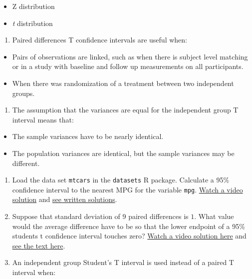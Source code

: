\documentclass[]{article}
\begin{document}
\begin{itemize}
\itemsep1pt\parskip0pt
\item
  Z distribution
\item
  \emph{t} distribution
\end{itemize}

\begin{enumerate}
\def\labelenumi{\arabic{enumi}.}
\setcounter{enumi}{1}
\itemsep1pt\parskip0pt
\item
  Paired differences T confidence intervals are useful when:
\end{enumerate}

\begin{itemize}
\itemsep1pt\parskip0pt
\item
  Pairs of observations are linked, such as when there is subject level
  matching or in a study with baseline and follow up measurements on all
  participants.
\item
  When there was randomization of a treatment between two independent
  groups.
\end{itemize}

\begin{enumerate}
\def\labelenumi{\arabic{enumi}.}
\setcounter{enumi}{2}
\itemsep1pt\parskip0pt
\item
  The assumption that the variances are equal for the independent group
  T interval means that:
\end{enumerate}

\begin{itemize}
\itemsep1pt\parskip0pt
\item
  The sample variances have to be nearly identical.
\item
  The population variances are identical, but the sample variances may
  be different.
\end{itemize}

\begin{enumerate}
\def\labelenumi{\arabic{enumi}.}
\setcounter{enumi}{3}
\itemsep1pt\parskip0pt
\item
  Load the data set \texttt{mtcars} in the \texttt{datasets} R package.
  Calculate a 95\% confidence interval to the nearest MPG for the
  variable \texttt{mpg}.
  \href{https://www.youtube.com/watch?v=5BPY6JqRLbE\&index=19\&list=PLpl-gQkQivXhHOcVeU3bSJg78zaDYbP9L}{Watch
  a video solution} and
  \href{http://bcaffo.github.io/courses/06_StatisticalInference/homework/hw3.html\#3}{see
  written solutions}.
\item
  Suppose that standard deviation of 9 paired differences is $1$. What
  value would the average difference have to be so that the lower
  endpoint of a 95\% students t confidence interval touches zero?
  \href{https://www.youtube.com/watch?v=ioDwUPCy508\&list=PLpl-gQkQivXhHOcVeU3bSJg78zaDYbP9L\&index=20}{Watch
  a video solution here} and
  \href{http://bcaffo.github.io/courses/06_StatisticalInference/homework/hw3.html\#4}{see
  the text here}.
\item
  An independent group Student's T interval is used instead of a paired
  T interval when:
\end{enumerate}
\end{document}
